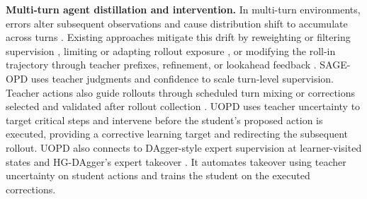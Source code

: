 \textbf{Multi-turn agent distillation and intervention.}
In multi-turn environments, errors alter subsequent observations and cause distribution shift to accumulate across turns \citep{wang2026exploring,sod2026,sageopd2026}. Existing approaches mitigate this drift by reweighting or filtering supervision \citep{sod2026,pruneopd2026,sdar2026}, limiting or adapting rollout exposure \citep{wang2026exploring,fullrollouts2026,adwin2026,turnopd2026}, or modifying the roll-in trajectory through teacher prefixes, refinement, or lookahead feedback \citep{reopd2026,trd2026,lgr2026,serl2026}. SAGE-OPD \citep{sageopd2026} uses teacher judgments and confidence to scale turn-level supervision. Teacher actions also guide rollouts through scheduled turn mixing \citep{guidedopd2026} or corrections selected and validated after rollout collection \citep{futurebridgeopd2026}. UOPD uses teacher uncertainty to target critical steps and intervene before the student's proposed action is executed, providing a corrective learning target and redirecting the subsequent rollout. UOPD also connects to DAgger-style expert supervision at learner-visited states \citep{ross2011dagger,distil2026} and HG-DAgger's expert takeover \citep{kelly2019hgdagger}. It automates takeover using teacher uncertainty on student actions and trains the student on the executed corrections.
